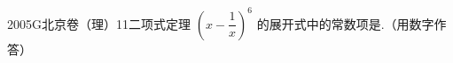 
\begin{problem}{2005}{G}{北京卷（理）}{11}{二项式定理}
$ \left(x-\dfrac{1}{x}\right)^6 $ 的展开式中的常数项是\underline{\hspace{4em}}.（用数字作答）
\end{problem}

\begin{answer}

\end{answer}

\begin{solutions}

\end{solutions}